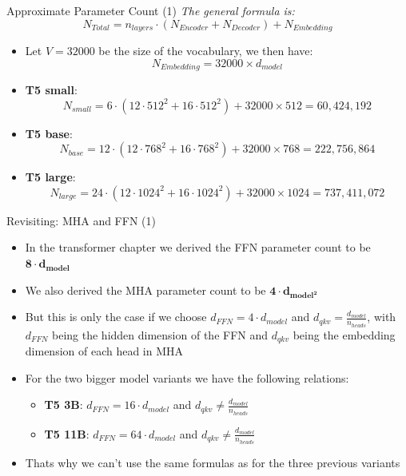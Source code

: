 \begin{frame}{Approximate Parameter Count (1)}
\textit{The general formula is:} $$N_{Total} = n_{layers}\cdot (N_{Encoder} + N_{Decoder}) + N_{Embedding}$$

\begin{itemize}
    \item Let $V = 32000$ be the size of the vocabulary, we then have: $$N_{Embedding} = 32000 \times d_{model}$$

    \item \textbf{T5 small}:
        $$N_{small} = 6\cdot (12\cdot 512^2 + 16\cdot 512^2) + 32000\times 512 = 60,424,192$$
    \item \textbf{T5 base}:
        $$N_{base} = 12\cdot (12\cdot 768^2 + 16\cdot 768^2) + 32000\times 768 = 222,756,864$$
    \item \textbf{T5 large}:
        $$N_{large} = 24\cdot (12\cdot 1024^2 + 16\cdot 1024^2) + 32000\times 1024 = 737,411,072$$
    
\end{itemize}
    
\end{frame}


\begin{frame}{Revisiting: MHA and FFN (1)}

\begin{itemize}
    \item In the transformer chapter we derived the FFN parameter count to be $\bm{8\cdot d_{model}}$
    \item We also derived the MHA parameter count to be $\bm{4\cdot d_{model^2}}$ 
    \item But this is only the case if we choose $d_{FFN} = 4\cdot d_{model}$ and $d_{qkv} = \frac{d_{model}}{n_{heads}}$, with $d_{FFN}$ being the hidden dimension of the FFN and $d_{qkv}$ being the embedding dimension of each head in MHA 
    \item For the two bigger model variants we have the following relations:
    \begin{itemize}
        \item \textbf{T5 3B}: $d_{FFN} = 16\cdot d_{model}$ and $d_{qkv} \neq \frac{d_{model}}{n_{heads}}$
        \item \textbf{T5 11B}: $d_{FFN} = 64\cdot d_{model}$ and $d_{qkv} \neq \frac{d_{model}}{n_{heads}}$ 
    \end{itemize}
    \item Thats why we can't use the same formulas as for the three previous variants
\end{itemize}
    
\end{frame}

